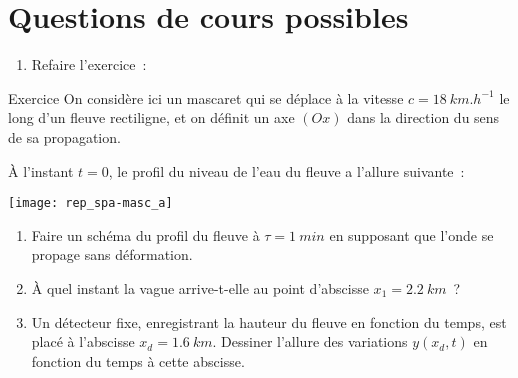 \documentclass[a4paper, 12pt, final, garamond]{book}
\begin{document}
\section{Questions de cours possibles}
\begin{enumerate}
    \item Refaire l'exercice~:
\end{enumerate}
\begin{NCexem}[width=\linewidth, breakable]{Exercice}
    On considère ici un mascaret qui se déplace à la vitesse $c =
    \SI{18}{km.h^{-1}}$ le long d'un fleuve rectiligne, et on définit un axe
    $(Ox)$ dans la direction du sens de sa propagation.

    À l'instant $t=0$, le profil du niveau de l'eau du fleuve a l'allure
    suivante~:
    \begin{center}
        \texttt{[image: rep\_spa-masc\_a]}
    \end{center}
    \begin{enumerate}[label=\sqenumi]
        \item Faire un schéma du profil du fleuve à $\tau = \SI{1}{min}$ en
            supposant que l'onde se propage sans déformation.
        \item À quel instant la vague arrive-t-elle au point d'abscisse $x_1 =
            \SI{2.2}{km}$~? 
        \item Un détecteur fixe, enregistrant la hauteur du fleuve en fonction
            du temps, est placé à l'abscisse $x_d = \SI{1.6}{km}$. Dessiner
            l'allure des variations $y(x_d,t)$ en fonction du temps à cette
            abscisse.
    \end{enumerate}
\end{NCexem}
\end{document}
